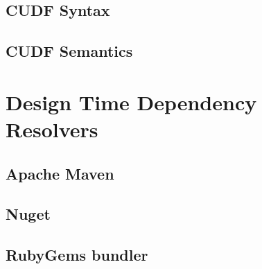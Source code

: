 \subsection{CUDF Syntax}




\subsection{CUDF Semantics}




\section{Design Time Dependency Resolvers}

\subsection{Apache Maven}

\subsection{Nuget} 

\subsection{RubyGems bundler}

